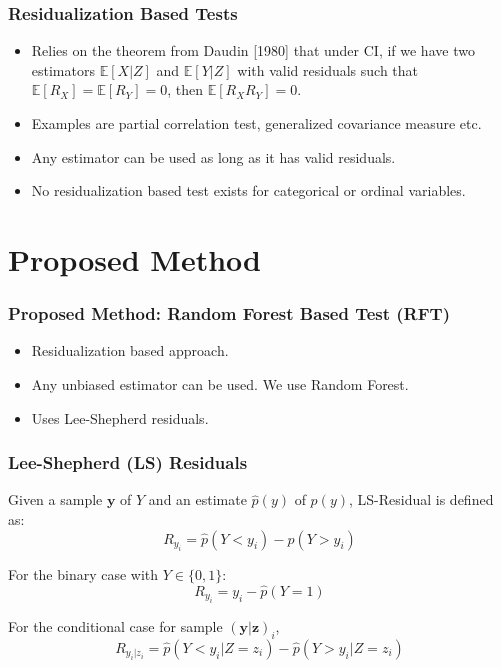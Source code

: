 \documentclass{beamer}
\begin{document}
\begin{frame}
	\frametitle{Residualization Based Tests}
	\begin{itemize}
		\setlength\itemsep{1em}
		\item Relies on the theorem from Daudin [1980] \footnotemark
			that under CI, if we have two estimators $ \mathbb{E}[X
			| Z] $ and $ \mathbb{E}[Y | Z] $ with valid residuals
			such that $ \mathbb{E}[R_X] = \mathbb{E}[R_Y] = 0 $,
			then $ \mathbb{E}[R_X R_Y] = 0 $.
		\item Examples are partial correlation test, generalized covariance measure etc.
		\item Any estimator can be used as long as it has valid residuals.
		\item No residualization based test exists for categorical or ordinal variables.
	\end{itemize}
\end{frame}

\section{Proposed Method}
\begin{frame}
	\frametitle{Proposed Method: Random Forest Based Test (RFT)}
	\begin{itemize}
		\setlength\itemsep{1em}
		\item Residualization based approach.
		\item Any unbiased estimator can be used. We use Random Forest.
		\item Uses Lee-Shepherd residuals.
	\end{itemize}
\end{frame}

\begin{frame}
	\frametitle{Lee-Shepherd (LS) Residuals}
	Given a sample $ \bm{y} $ of $ Y $ and an estimate $ \hat{p}(y) $ of $ p(y) $,
	LS-Residual is defined as:
	$$ R_{y_i} = \hat{p}(Y < y_i) - \hat{p}(Y > y_i) $$
	\vspace{1em}

	For the binary case with $ Y \in \{0, 1\} $:
	$$ R_{y_i} = y_i - \hat{p}(Y = 1) $$
	\vspace{1em}

	For the conditional case for sample $ (\bm{y}|\bm{z})_i $,
	$$ R_{y_i | z_i} = \hat{p}(Y < y_i | Z=z_i) - \hat{p}(Y>y_i|Z=z_i) $$
\end{frame}
\end{document}
